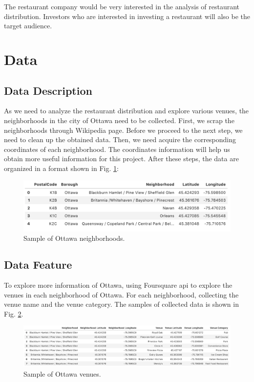 \documentclass[14pt, conference, onecolumn]{IEEEtran}
\begin{document}
The restaurant company would be very interested in the analysis of restaurant distribution. Investors who are interested in investing a restaurant will also be the target audience.

\section{Data}

\subsection{Data Description}
As we need to analyze the restaurant distribution and explore various venues, the neighborhoods in the city of Ottawa need to be collected. First, we scrap the neighborhoods through Wikipedia page. Before we proceed to the next step, we need to clean up the obtained data. Then, we need acquire the corresponding coordinates of each neighborhood. The coordinates information will help us obtain more useful information for this project. After these steps, the data are organized in a format shown in Fig. \ref{fig:ottawa_nei}: 
\begin{figure}[]
        \centering
        \includegraphics[width=1\columnwidth]{img/ottawa1.png}
        \caption{Sample of Ottawa neighborhoods.}
        \label{fig:ottawa_nei}
\end{figure}


\subsection{Data Feature}
To explore more information of Ottawa, using Foursquare api to explore the venues in each neighborhood of Ottawa. For each neighborhood, collecting the venue name and the venue category. The samples of collected data is shown in Fig. \ref{fig:ottawa_venue}.
\begin{figure}[]
        \centering
        \includegraphics[width=1\columnwidth]{img/ottawa2.png}
        \caption{Sample of Ottawa venues.}
        \label{fig:ottawa_venue}
\end{figure}
\end{document}
